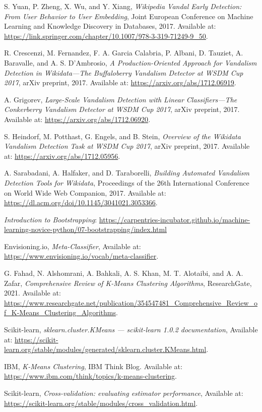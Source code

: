 \documentclass[
    13pt, %
    a4paper, %
    listof=totoc, %
    bibliography=totoc, %
    index=totoc, %
    headsepline
]{scrreprt}
\begin{document}
\begin{thebibliography}{9}
S. Yuan, P. Zheng, X. Wu, and Y. Xiang,
\textit{Wikipedia Vandal Early Detection: From User Behavior to User Embedding},
Joint European Conference on Machine Learning and Knowledge Discovery in Databases, 2017. Available at: \url{https://link.springer.com/chapter/10.1007/978-3-319-71249-9_50}.

R. Crescenzi, M. Fernandez, F. A. Garcia Calabria, P. Albani, D. Tauziet, A. Baravalle, and A. S. D’Ambrosio,
\textit{A Production-Oriented Approach for Vandalism Detection in Wikidata—The Buffaloberry Vandalism Detector at WSDM Cup 2017},
arXiv preprint, 2017. Available at: \url{https://arxiv.org/abs/1712.06919}.

A. Grigorev,
\textit{Large-Scale Vandalism Detection with Linear Classifiers—The Conkerberry Vandalism Detector at WSDM Cup 2017},
arXiv preprint, 2017. Available at: \url{https://arxiv.org/abs/1712.06920}.

S. Heindorf, M. Potthast, G. Engels, and B. Stein,
\textit{Overview of the Wikidata Vandalism Detection Task at WSDM Cup 2017},
arXiv preprint, 2017. Available at: \url{https://arxiv.org/abs/1712.05956}.

A. Sarabadani, A. Halfaker, and D. Taraborelli,
\textit{Building Automated Vandalism Detection Tools for Wikidata},
Proceedings of the 26th International Conference on World Wide Web Companion, 2017. Available at: \url{https://dl.acm.org/doi/10.1145/3041021.3053366}.

\textit{Introduction to Bootstrapping}:
\url{https://carpentries-incubator.github.io/machine-learning-novice-python/07-bootstrapping/index.html}

Envisioning.io, \textit{Meta-Classifier},
Available at: \url{https://www.envisioning.io/vocab/meta-classifier}.

G. Fahad, N. Alshomrani, A. Bahkali, A. S. Khan, M. T. Alotaibi, and A. A. Zafar,
\textit{Comprehensive Review of K-Means Clustering Algorithms},
ResearchGate, 2021. Available at: \url{https://www.researchgate.net/publication/354547481_Comprehensive_Review_of_K-Means_Clustering_Algorithms}.

Scikit-learn,
\textit{sklearn.cluster.KMeans — scikit-learn 1.0.2 documentation},
Available at: \url{https://scikit-learn.org/stable/modules/generated/sklearn.cluster.KMeans.html}.

IBM,
\textit{K-Means Clustering},
IBM Think Blog. Available at: \url{https://www.ibm.com/think/topics/k-means-clustering}.

Scikit-learn,
\textit{Cross-validation: evaluating estimator performance},
Available at: \url{https://scikit-learn.org/stable/modules/cross_validation.html}.

\end{thebibliography}
\end{document}
